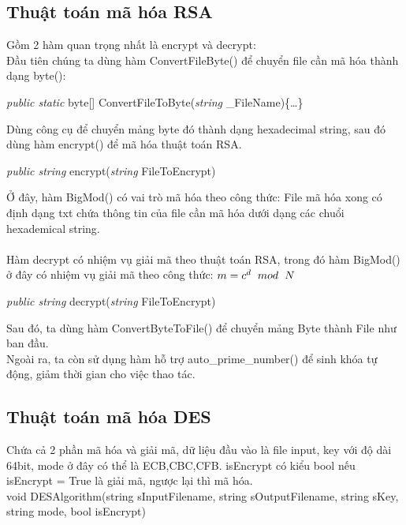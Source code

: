 \documentclass[paper=a4, fontsize=11pt]{scrartcl}	%
\numberwithin{equation}{section}															%
\numberwithin{figure}{section}																%
\numberwithin{table}{section}																%
\begin{document}
\subsection{Thuật toán mã hóa RSA}
Gồm 2 hàm quan trọng nhất là encrypt và decrypt:\\
Đầu tiên chúng ta dùng hàm ConvertFileByte() để chuyển file cần mã hóa thành dạng byte():\\
      \begin{center}
	\emph{public static} byte[] ConvertFileToByte(\emph{string} \_FileName)\{…\}
	\end{center}
Dùng công cụ để chuyển mảng byte đó thành dạng hexadecimal string, sau đó dùng hàm encrypt() để mã hóa thuật toán RSA.\\
       \begin{center}
	\emph{public string} encrypt(\emph{string} FileToEncrypt)
	\end{center}
Ở đây, hàm BigMod() có vai trò mã hóa theo công thức:  
File mã hóa xong có định dạng txt chứa thông tin của file cần mã hóa dưới dạng các chuổi hexademical string.\\ \\
	Hàm decrypt có nhiệm vụ giải mã theo thuật toán RSA, trong đó hàm BigMod() ở đây có nhiệm vụ giải mã theo công thức: $ m = c^d \hspace{0.2cm} mod \hspace{0.2cm} N$
	\begin{center}
	\emph{public string} decrypt(\emph{string} FileToEncrypt)
	\end{center}
	Sau đó, ta dùng hàm ConvertByteToFile() để chuyển mảng Byte thành File như ban đầu.\\
	
	Ngoài ra, ta còn sử dụng hàm hỗ trợ auto\_prime\_number() để sinh khóa tự động, giảm thời gian cho việc thao tác.
\subsection{Thuật toán mã hóa DES} 
Chứa cả 2 phần mã hóa và giải mã, dữ liệu đầu vào là file input, key với độ dài 64bit,
mode ở đây có thể là ECB,CBC,CFB. isEncrypt có kiểu bool nếu isEncrypt = True là giải mã, ngược lại thì mã hóa.\\

void DESAlgorithm(string sInputFilename, string sOutputFilename, string sKey, string mode, bool isEncrypt)
\end{document}

